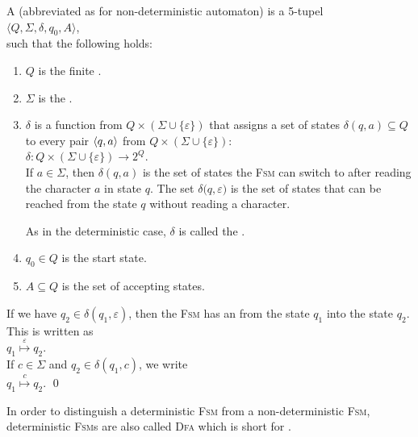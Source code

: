 \begin{Definition}[NFA]
A  
(abbreviated as  for non-deterministic automaton) 
is a  5-tupel  
\\[0.2cm]
\hspace*{1.3cm}
$\langle Q, \Sigma, \delta, q_0, A\rangle$,
\\[0.2cm]
such that the following holds:
\begin{enumerate}
\item $Q$ is the finite .
\item $\Sigma$ is the .
\item $\delta$ is a function from $Q \times (\Sigma \cup \{ \varepsilon \})$ that assigns a set of states
      $\delta(q, a) \subseteq Q$ to every pair $\pair(q, a)$ from $Q \times (\Sigma \cup \{ \varepsilon \})$:
      \\[0.2cm]
      \hspace*{1.3cm}
      $\delta: Q \times (\Sigma \cup \{\varepsilon\}) \rightarrow 2^Q$.
      \\[0.2cm]
      If $a \in \Sigma$, then $\delta(q, a)$ is the set of states the \textsc{Fsm} can switch to
      after reading the character $a$ in state $q$.  The set $\delta\bigl(q, \varepsilon)$ is the
      set of states that can be reached from the state $q$ without reading a character.
      
      As in the deterministic case, $\delta$ is called the .
\item $q_0 \in Q$ is the start state.
\item $A \subseteq Q$ is the set of accepting states. 
\end{enumerate}
If we have $q_2 \in \delta(q_1, \varepsilon)$, then the \textsc{Fsm} has an
 from the state $q_1$ into the state $q_2$.  This is written as
\\[0.2cm]
\hspace*{1.3cm}
$q_1 \stackrel{\varepsilon}{\mapsto} q_2$.
\\[0.2cm]
If  $c \in \Sigma$ and  $q_2 \in \delta(q_1, c)$, we write
\\[0.2cm]
\hspace*{1.3cm}
$q_1 \stackrel{c}{\mapsto} q_2$. \qed
\end{Definition}

In order to distinguish a deterministic \textsc{Fsm} from a non-deterministic \textsc{Fsm}, deterministic
\textsc{Fsm}s are also called \textsc{Dfa}  which is short for 
. 



